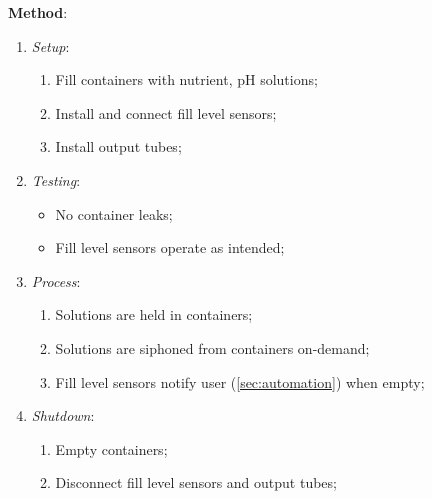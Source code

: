 \documentclass{report}
\begin{document}
\textbf{Method}:
\begin{enumerate}
    \item \textit{Setup}:
    \begin{enumerate}
        \item Fill containers with nutrient, pH solutions;
        \item Install and connect fill level sensors;
        \item Install output tubes;
    \end{enumerate}
    \item \textit{Testing}:
    \begin{itemize}
        \item No container leaks;
        \item Fill level sensors operate as intended;
    \end{itemize}
    \item \textit{Process}:
    \begin{enumerate}
        \item Solutions are held in containers;
        \item Solutions are siphoned from containers on-demand;
        \item Fill level sensors notify user (\ref{sec:automation}) when empty;
    \end{enumerate}
    \item \textit{Shutdown}:
    \begin{enumerate}
        \item Empty containers;
        \item Disconnect fill level sensors and output tubes;
    \end{enumerate}
\end{enumerate}
\end{document}
